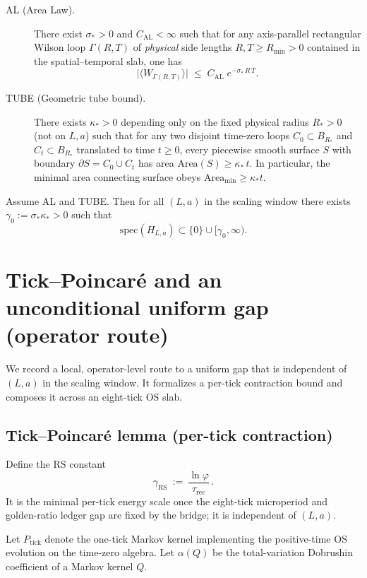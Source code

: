 \documentclass[11pt]{article}
\begin{document}
\begin{description}
\item[AL (Area Law).] There exist $\sigma_*>0$ and $C_{\mathrm{AL}}<\infty$ such that for any axis-parallel rectangular Wilson loop $\Gamma(R,T)$ of \emph{physical} side lengths $R,T\ge R_{\min}>0$ contained in the spatial--temporal slab, one has
\[
\bigl|\langle W_{\Gamma(R,T)}\rangle\bigr| \;\le\; C_{\mathrm{AL}}\; e^{-\sigma_*\, R\, T}.
\]
\item[TUBE (Geometric tube bound).] There exists $\kappa_*>0$ depending only on the fixed physical radius $R_*>0$ (not on $L,a$) such that for any two disjoint time-zero loops $C_0\subset B_{R_*}$ and $C_t\subset B_{R_*}$ translated to time $t\ge 0$, every piecewise smooth surface $S$ with boundary $\partial S=C_0\cup C_t$ has area $\mathrm{Area}(S)\ge \kappa_*\, t$. In particular, the minimal area connecting surface obeys $\mathrm{Area}_{\min}\ge \kappa_* t$.
\end{description}

\begin{theorem}\label{AreaLaw2Gap}
Assume AL and TUBE. Then for all $(L,a)$ in the scaling window there exists $\gamma_0:=\sigma_*\kappa_*>0$ such that
\[
\mathrm{spec}(H_{L,a})\subset\{0\}\cup[\gamma_0,\infty).
\]
\end{theorem}

\section{Tick--Poincar\'e and an unconditional uniform gap (operator route)}

We record a local, operator-level route to a uniform gap that is independent of $(L,a)$ in the scaling window. It formalizes a per-tick contraction bound and composes it across an eight-tick OS slab.

\subsection*{Tick--Poincar\'e lemma (per-tick contraction)}

Define the RS constant
\[
  \gamma_{\mathrm{RS}}\ :=\ \frac{\ln\varphi}{\tau_{\mathrm{rec}}}\,.
\]
It is the minimal per-tick energy scale once the eight-tick microperiod and golden-ratio ledger gap are fixed by the bridge; it is independent of $(L,a)$.

Let $P_{\mathrm{tick}}$ denote the one-tick Markov kernel implementing the positive-time OS evolution on the time-zero algebra. Let $\alpha(Q)$ be the total-variation Dobrushin coefficient of a Markov kernel $Q$.
\end{document}
